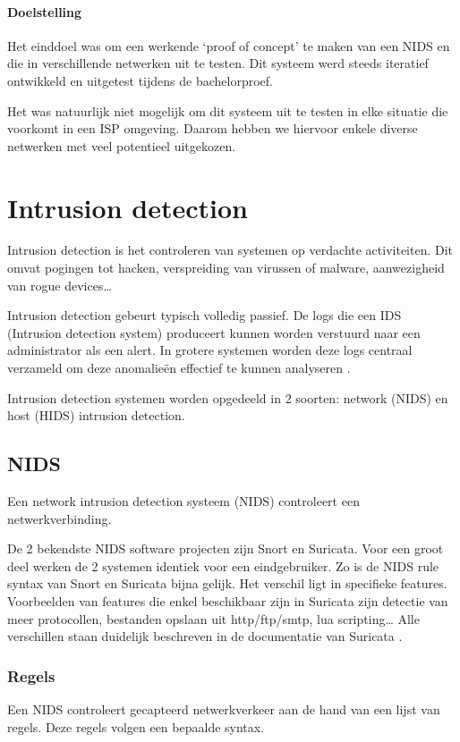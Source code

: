 \documentclass[a4paper,12pt]{report}
\begin{document}
\subsubsection{Doelstelling}
Het einddoel was om een werkende `proof of concept' te maken van een NIDS en die in verschillende netwerken uit te testen.
Dit systeem werd steeds iteratief ontwikkeld en uitgetest tijdens de bachelorproef.

Het was natuurlijk niet mogelijk om dit systeem uit te testen in elke situatie die voorkomt in een ISP omgeving.
Daarom hebben we hiervoor enkele diverse netwerken met veel potentieel uitgekozen.

\chapter{Intrusion detection}
Intrusion detection is het controleren van systemen op verdachte activiteiten.
Dit omvat pogingen tot hacken, verspreiding van virussen of malware, aanwezigheid van rogue devices\dots

Intrusion detection gebeurt typisch volledig passief.
De logs die een IDS (Intrusion detection system) produceert kunnen worden verstuurd naar een administrator als een alert.
In grotere systemen worden deze logs centraal verzameld om deze anomalieën effectief te kunnen analyseren \autocite{wikipedia:ids}.

Intrusion detection systemen worden opgedeeld in 2 soorten: network (NIDS) en host (HIDS) intrusion detection.

\section{NIDS}
Een network intrusion detection systeem (NIDS) controleert een netwerkverbinding.

De 2 bekendste NIDS software projecten zijn Snort en Suricata.
Voor een groot deel werken de 2 systemen identiek voor een eindgebruiker.
Zo is de NIDS rule syntax van Snort en Suricata bijna gelijk.
Het verschil ligt in specifieke features.
Voorbeelden van features die enkel beschikbaar zijn in Suricata zijn detectie van meer protocollen, bestanden opslaan uit http/ftp/smtp, lua scripting\dots
Alle verschillen staan duidelijk beschreven in de documentatie van Suricata \autocite{suricata:docs}.

\subsection{Regels}
Een NIDS controleert gecapteerd netwerkverkeer aan de hand van een lijst van regels.
Deze regels volgen een bepaalde syntax.
\end{document}
